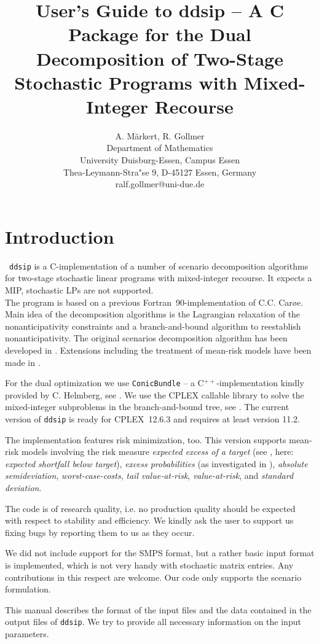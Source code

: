 \documentclass[11pt,draft]{article}
\title{\huge User's Guide to ddsip -- A C Package for the Dual
Decomposition of Two-Stage Stochastic Programs with Mixed-Integer Recourse}
\author{A. M\"arkert, R. Gollmer\\
	Department of Mathematics\\
	University Duisburg-Essen, Campus Essen\\
	Thea-Leymann-Stra"se 9, D-45127 Essen, Germany\\
	\small ralf.gollmer@uni-due.de
}
\newcommand{\+}{{\ti{+}}}
\newcommand{\1}{{\ti{1}}}
\begin{document}
\maketitle

\section{Introduction}
 \texttt{ddsip} is a C-implementation of a number of scenario decomposition algorithms for two-stage
stochastic linear programs with mixed-integer recourse. It expects a MIP, stochastic LPs are not supported.\\
The program is based on a previous Fortran~90-implementation
of C.C. Car\o e. Main idea of the decomposition algorithms is the Lagrangian relaxation of the
non\-anti\-ci\-pa\-tivity constraints and a branch-and-bound algorithm to reestablish
non\-anti\-ci\-pa\-tivity. The original scenarios decomposition algorithm has been developed in
\cite{cs1}. Extensions including the treatment of mean-risk models have been made in \cite{diss}. 

For the dual optimization we use \texttt{ConicBundle} -- a C$^{++}$-implementation kindly provided by
C. Helmberg, see \cite{CB}. We use the CPLEX callable library to solve the mixed-integer subproblems in
the branch-and-bound tree, see \cite{cp}. The current version of \texttt{ddsip} is ready for CPLEX~12.6.3
and requires at least version 11.2.

The implementation features risk minimization, too. This version supports mean-risk models involving
the risk measure {\it expected excess of a target} (see \cite{og}, here: {\it expected shortfall below
target}), {\it excess probabilities} (as investigated in \cite{tied}), {\it absolute semideviation},
{\it worst-case-costs}, {\it tail value-at-risk}, {\it value-at-risk}, and {\it standard deviation}.

The code is of research quality, i.e. no production quality should be expected with respect to stability
and efficiency.
We kindly ask the user to support us fixing bugs by reporting them to us as they occur.

We did not %
include support for the SMPS format, but a rather basic input format is implemented, which
is not very handy with stochastic matrix entries. Any contributions in this respect are welcome.
Our code only supports the scenario formulation.

This manual describes the format of the input files and the data contained in the output
files of \texttt{ddsip}. We try to provide all necessary information on the input parameters.
\end{document}
